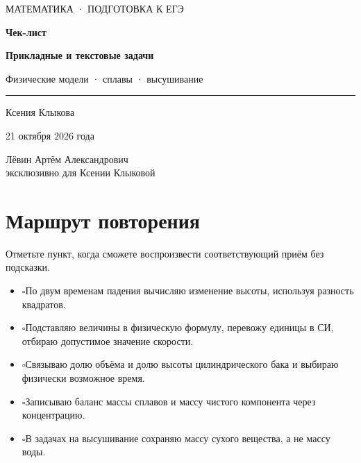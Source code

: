 \documentclass[a4paper,12pt]{article}
\newcommand{\checkitem}{\(\square\)\enspace}
\newcommand{\sectiontitle}[1]{\needspace{6\baselineskip}\section*{\color{deepaccent}#1}}
\begin{document}
\thispagestyle{empty}
\begin{center}
\vspace*{28mm}
{\color{accent}\large МАТЕМАТИКА · ПОДГОТОВКА К ЕГЭ}\par
\vspace{21mm}
{\Huge\bfseries Чек-лист}\par
\vspace{8mm}
{\LARGE\color{deepaccent}\bfseries Прикладные и текстовые задачи}\par
\vspace{6mm}
{\large Физические модели · сплавы · высушивание}\par
\vspace{17mm}
\rule{0.65\textwidth}{0.5pt}\par
\vspace{10mm}
{\Large Ксения Клыкова}\par
\vspace{4mm}
{\large 21 октября 2026 года}\par
\vfill
{\normalsize\color{textgray} Лёвин Артём Александрович\\[3pt] эксклюзивно для Ксении Клыковой}\par
\vspace{12mm}
\vspace*{7mm}
\end{center}
\clearpage

\sectiontitle{Маршрут повторения}
Отметьте пункт, когда сможете воспроизвести соответствующий приём без подсказки.
\begin{itemize}[label={}]
\item \checkitem По двум временам падения вычисляю изменение высоты, используя разность квадратов.
\item \checkitem Подставляю величины в физическую формулу, перевожу единицы в СИ, отбираю допустимое значение скорости.
\item \checkitem Связываю долю объёма и долю высоты цилиндрического бака и выбираю физически возможное время.
\item \checkitem Записываю баланс массы сплавов и массу чистого компонента через концентрацию.
\item \checkitem В задачах на высушивание сохраняю массу сухого вещества, а не массу воды.
\end{itemize}
\end{document}
